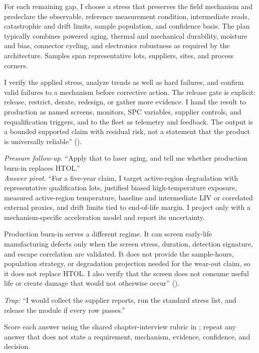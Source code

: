 For each remaining gap, I choose a stress that preserves the field mechanism
and predeclare the observable, reference measurement condition, intermediate
reads, catastrophic and drift limits, sample population, and confidence basis.
The plan typically combines powered aging, thermal and mechanical durability,
moisture and bias, connector cycling, and electronics robustness as required by
the architecture. Samples span representative lots, suppliers, sites, and
process corners.

I verify the applied stress, analyze trends as well as hard failures, and
confirm valid failures to a mechanism before corrective action. The release
gate is explicit: release, restrict, derate, redesign, or gather more evidence.
I hand the result to production as named screens, monitors, SPC variables,
supplier controls, and requalification triggers, and to the fleet as telemetry
and feedback. The output is a bounded supported claim with residual risk, not a
statement that the product is universally reliable''
().

\textit{Pressure follow-up.} ``Apply that to laser aging, and tell me whether
production burn-in replaces HTOL.''\\
\textit{Answer pivot.}
``For a five-year claim, I target active-region degradation with representative
qualification lots, justified biased high-temperature exposure, measured
active-region temperature, baseline and intermediate LIV or correlated external
proxies, and drift limits tied to end-of-life margin. I project only with a
mechanism-specific acceleration model and report its uncertainty.

Production burn-in serves a different regime. It can screen early-life
manufacturing defects only when the screen stress, duration, detection
signature, and escape correlation are validated. It does not provide the
sample-hours, population strategy, or degradation projection needed for the
wear-out claim, so it does not replace HTOL. I also verify that the screen does
not consume useful life or create damage that would not otherwise occur''
().

\textit{Trap:} ``I would collect the supplier reports, run the standard stress
list, and release the module if every row passes.''

Score each answer using the shared chapter-interview rubric in
; repeat any answer that does not state a
requirement, mechanism, evidence, confidence, and decision.
